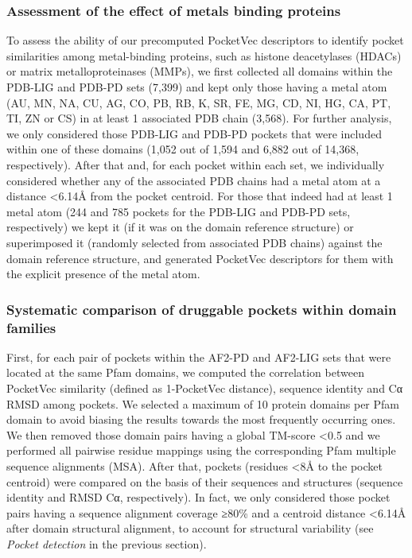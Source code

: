 \subsubsection{Assessment of the effect of metals binding proteins}

To assess the ability of our precomputed PocketVec descriptors to identify pocket similarities among metal-binding proteins, such as histone deacetylases (HDACs) or matrix metalloproteinases (MMPs), we first collected all domains within the PDB-LIG and PDB-PD sets (7,399) and kept only those having a metal atom (AU, MN, NA, CU, AG, CO, PB, RB, K, SR, FE, MG, CD, NI, HG, CA, PT, TI, ZN or CS) in at least 1 associated PDB chain (3,568). For further analysis, we only considered those PDB-LIG and PDB-PD pockets that were included within one of these domains (1,052 out of 1,594 and 6,882 out of 14,368, respectively). After that and, for each pocket within each set, we individually considered whether any of the associated PDB chains had a metal atom at a distance <6.14Å from the pocket centroid. For those that indeed had at least 1 metal atom (244 and 785 pockets for the PDB-LIG and PDB-PD sets, respectively) we kept it (if it was on the domain reference structure) or superimposed it (randomly selected from associated PDB chains) against the domain reference structure, and generated PocketVec descriptors for them with the explicit presence of the metal atom. 


\subsubsection{Systematic comparison of druggable pockets within domain families}

First, for each pair of pockets within the AF2-PD and AF2-LIG sets that were located at the same Pfam domains, we computed the correlation between PocketVec similarity (defined as 1-PocketVec distance), sequence identity and Cα RMSD among pockets. We selected a maximum of 10 protein domains per Pfam domain to avoid biasing the results towards the most frequently occurring ones. We then removed those domain pairs having a global TM-score <0.5 and we performed all pairwise residue mappings using the corresponding Pfam multiple sequence alignments (MSA). After that, pockets (residues <8Å to the pocket centroid) were compared on the basis of their sequences and structures (sequence identity and RMSD Cα, respectively). In fact, we only considered those pocket pairs having a sequence alignment coverage ≥80\% and a centroid distance <6.14Å after domain structural alignment, to account for structural variability (see \textit{Pocket detection} in the previous section).

